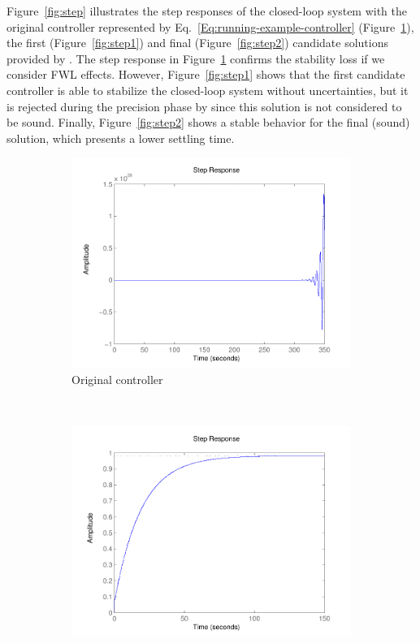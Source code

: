 \documentclass[final]{sig-alternate-05-2015}
\begin{document}
Figure~\ref{fig:step} illustrates the step responses of the closed-loop
system with the original controller represented by
Eq.~\eqref{Eq:running-example-controller} (Figure~\ref{fig:step0}), the
first (Figure~\ref{fig:step1}) and final (Figure~\ref{fig:step2}) candidate
solutions provided by \tool.  The step response in Figure~\ref{fig:step0}
confirms the stability loss if we consider FWL effects.  However,
Figure~\ref{fig:step1} shows that the first candidate controller is able to
stabilize the closed-loop system without uncertainties, but it is rejected
during the {\sc precision} phase by \tool since this solution is not
considered to be sound.  Finally, Figure~\ref{fig:step2} shows a stable
behavior for the final (sound) solution, which presents a lower settling
time.

\begin{figure}
    \centering
    \begin{subfigure}[b]{0.3\textwidth}
        \includegraphics[width=\textwidth]{figures/runningexample_step0.pdf}
        \caption{Original controller}
        \label{fig:step0}
    \end{subfigure}
    ~
    \begin{subfigure}[b]{0.3\textwidth}
        \includegraphics[width=\textwidth]{figures/runningexample_step1.pdf}

\end{subfigure}
\end{figure}
\end{document}
